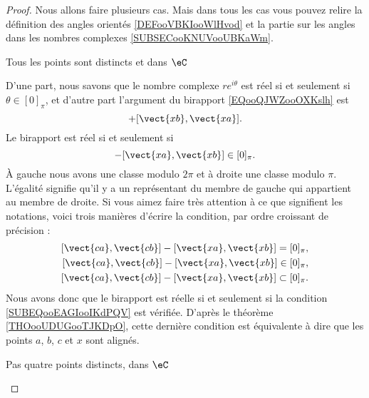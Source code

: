 \begin{proof}
    Nous allons faire plusieurs cas. Mais dans tous les cas vous pouvez relire la définition des angles orientés \ref{DEFooVBKIooWlHvod} et la partie sur les angles dans les nombres complexes \ref{SUBSECooKNUVooUBKaWm}.
    \begin{subproof}
        \item[Tous les points sont distincts et dans \( \eC\)]

            D'une part, nous savons que le nombre complexe \( r e^{i\theta}\) est réel si et seulement si \( \theta\in[0]_{\pi}\), et d'autre part l'argument du birapport \eqref{EQooQJWZooOXKslh} est
            \begin{equation}
                [\vect{ ca },\vect{ cb }]+[\vect{ xb },\vect{ xa }].
            \end{equation}
            Le birapport est réel si et seulement si
            \begin{equation}
                [\vect{ ca },\vect{ cb }]-[\vect{ xa },\vect{ xb }]\in[0]_{\pi}.
            \end{equation}
            À gauche nous avons une classe modulo \( 2\pi\) et à droite une classe modulo \( \pi\). L'égalité signifie qu'il y a un représentant du membre de gauche qui appartient au membre de droite. Si vous aimez faire très attention à ce que signifient les notations, voici trois manières d'écrire la condition, par ordre croissant de précision :
            \begin{subequations}
                \begin{align}
                    [\vect{ ca },\vect{ cb }]-[\vect{ xa },\vect{ xb }]=[0]_{\pi},\\
                    [\vect{ ca },\vect{ cb }]-[\vect{ xa },\vect{ xb }]\in[0]_{\pi},\\
                    [\vect{ ca },\vect{ cb }]-[\vect{ xa },\vect{ xb }]\subset[0]_{\pi}.        \label{SUBEQooEAGIooIKdPQV}
                \end{align}
            \end{subequations}
            Nous avons donc que le birapport est réelle si et seulement si la condition \eqref{SUBEQooEAGIooIKdPQV} est vérifiée. D'après le théorème \ref{THOooUDUGooTJKDpO}, cette dernière condition est équivalente à dire que les points \( a\), \( b\), \( c\) et \( x\) sont alignés.

        \item[Pas quatre points distincts, dans \( \eC\)]


\end{subproof}
\end{proof}
